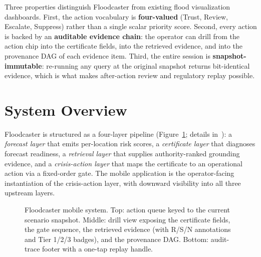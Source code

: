 \documentclass[sigconf,nonacm=true,review,authoryear]{acmart}
\begin{document}
Three properties distinguish Floodcaster from existing flood
visualization dashboards. First, the action vocabulary is
\textbf{four-valued} (Trust, Review, Escalate, Suppress) rather than
a single scalar priority score. Second, every action is backed by an
\textbf{auditable evidence chain}: the operator can drill from the
action chip into the certificate fields, into the retrieved evidence,
and into the provenance DAG of each evidence item. Third, the entire
session is \textbf{snapshot-immutable}: re-running any query at the
original snapshot returns bit-identical evidence, which is what makes
after-action review and regulatory replay possible.

\section{System Overview}
\label{sec:demo-system}

Floodcaster is structured as a four-layer pipeline
(Figure~\ref{fig:demo-arch}; details
in~\citet{martin2026floodrsct}): a \emph{forecast layer} that emits
per-location risk scores, a \emph{certificate layer} that diagnoses
forecast readiness, a \emph{retrieval layer} that supplies
authority-ranked grounding evidence, and a \emph{crisis-action layer}
that maps the certificate to an operational action via a fixed-order
gate. The mobile application is the operator-facing instantiation of
the crisis-action layer, with downward visibility into all three
upstream layers.

\begin{figure}[h]
\centering
\fbox{\rule{0pt}{3.5cm}\hspace{0.92\columnwidth}}
\caption{Floodcaster mobile system. Top: action queue keyed to the
  current scenario snapshot. Middle: drill view exposing the
  certificate fields, the gate sequence, the retrieved evidence (with
  R/S/N annotations and Tier 1/2/3 badges), and the provenance DAG.
  Bottom: audit-trace footer with a one-tap replay handle.}
\label{fig:demo-arch}
\end{figure}
\end{document}

